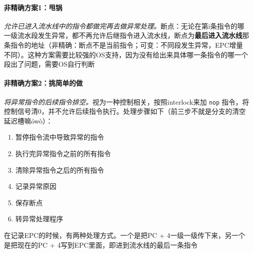\documentclass[]{report}
\begin{document}
		\paragraph{非精确方案1：甩锅} \textit{允许已进入流水线中的指令都做完再去做异常处理。}断点：无论在第i条指令的哪一级流水段发生异常，都不再允许后继指令进入流水线，断点为\textbf{最后进入流水线}那条指令的地址（非精确：断点不是当前指令；可变：不同段发生异常，EPC增量不同）。这种方案需要比较强的OS支持，因为没有给出来具体哪一条指令的哪一个段出了问题，需要OS自行判断
		\paragraph{非精确方案2：挑简单的做} \textit{将异常指令的后续指令排空。}视为一种控制相关，按照interlock来加 \verb|nop| 指令，将控制信号清0，并不允许后续指令执行。处理步骤如下（前三步不就是分支的清空延迟槽嘛\'ow\`o）：
		\begin{enumerate}
			\item 暂停指令流中导致异常的指令
			\item 执行完异常指令之前的所有指令
			\item 清除异常指令之后的所有指令
			\item 记录异常原因
			\item 保存断点
			\item 转异常处理程序
		\end{enumerate}
		在记录EPC的时候，有两种处理方式。一个是把PC + 4一级一级传下来，另一个是把现在的PC + 4写到EPC里面，即进到流水线的最后一条指令\newline
\end{document}
